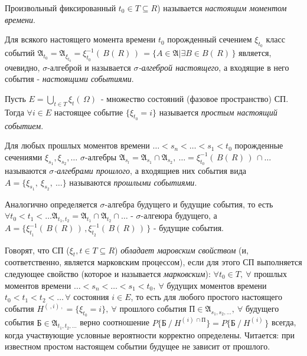 \begin{defs}
  Произвольный фиксированный $t_0 \in T \subseteq R$) называется \textit{настоящим моментом времени}.
\end{defs}

\begin{defs}
  Для всякого настоящего момента времени $t_0$ порожденный сечением $\xi_{t_0}$ класс событий $\mathfrak{A}_{t_0} = \mathfrak{A}_{\xi_{t_0}} =
  \xi_{t_0}^{-1}( \, B( \,R) \,) \, = \{A \in \mathfrak{A} | \exists B \in B( \, R) \,\}$ является, очевидно, $\sigma$-алгеброй и называется
  \textit{$\sigma$-алгеброй настоящего}, а входящие в него события - \textit{настоящими событиями}.
\end{defs}

\begin{defs}
  Пусть $E = \bigcup\limits_{t \in T}\xi_t( \, \Omega) \,$ - множество состояний (фазовое пространство) СП.
  Тогда $\forall i \in E$ настоящее событие $\{\xi_{t_0} = i\}$ называется \textit{простым настоящий событием}.
\end{defs}

\begin{defs}
  Для любых прошлых моментов времени $\ldots < s_n < \ldots < s_1 < t_0$ порожденные сечениями $\xi_{s_1}, \xi_{s_2}, \ldots$
  $\sigma$-алгебры $\mathfrak{A}_{s_l} = \mathfrak{A}_{s_1} \cap \mathfrak{A}_{s_2}, \ \ldots = \xi_{t_0}^{-1}( \, B( \,R) \,) \, \cap \ldots$
  называются \textit{$\sigma$-алгебрами прошлого}, а входящиев них события вида $A = \{\xi_{s_1}, \ \xi_{s_2}, \ \ldots\}$ называются
  \textit{прошлыми событиями}.
\end{defs}

\begin{defs}
  Аналогично определяется $\sigma$-алгебра будущего и будущие события, то есть $\forall t_0 < t_1 < \ldots \mathfrak{A}_{t_1,t_2} =
  \mathfrak{A}_{t_1} \cap \mathfrak{A}_{t_2} \cap \ldots$ - $\sigma$-алгеюра будущего, а
  $A = \{\xi_{t_1}^{-1}( \, B( \,R) \,) \,, \xi_{t_2}^{-1}( \, B( \,R) \,) \,\}$ - будущие события.
\end{defs}

\begin{defs}
  Говорят, что СП  ($\xi_t, t \in T \subseteq R$) \textit{обладает маровским свойством} (и, соответственно, является марковским процессом), если
  для этого СП выполняется следующее свойство (которое и называется \textit{марковским}): $\forall t_0 \in T, \ \forall$ прошлых моментов
  времени  $\ldots < s_n < \ldots < s_1 < t_0, \ \forall$ будущих моментов времени $t_0 < t_1 < t_2 < \ldots \, \forall$ состояния $i \in E$, то есть
  для любого простого настоящего события $H^{(\ ,i)\ ,} = \{\xi_{t_0} = i\}, \ \forall$ прошлого события $\text{П} \in \mathfrak{A}_{s_1,s_2,\ldots}, \
  \forall$ будущего события $\text{Б} \in \mathfrak{A}_{t_1, t_2, \ldots}$ верно соотношение $P\{\text{Б} \ / \ H^{( \,i) \, \cap \text{П}}\}=
  P\{\text{Б} \ / \ H^{( \,i) \,}\}$ всегда, когда участвующие условные вероятности корректно определены. Читается: при известном простом настоящем
  событии будущее не зависит от прошлого.
\end{defs}


